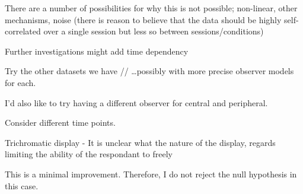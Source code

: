 There are a number of possibilities for why this is not possible; non-linear, other mechanisms, noise (there is reason to believe that the data should be highly self-correlated over a single session but less so between sessions/conditions)






Further investigations might add time dependency

Try the other datasets we have //
\dots possibly with more precise observer models for each.

I'd also like to try having a different observer for central and peripheral.

Consider different time points.	

Trichromatic display - 
It is unclear what the nature of the display, regards limiting the ability of the respondant to freely 



This is a minimal improvement. Therefore, I do not reject the null hypothesis in this case.
